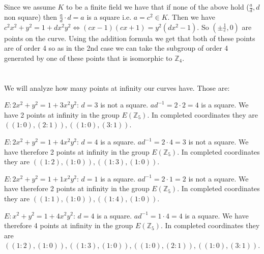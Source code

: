 \documentclass[12pt, a4paper]{article}
\begin{document}
Since we assume $K$ to be a finite field we have that if none of the above hold ($\frac{a}{d}, d$ non square) then $\frac{a}{d}\cdot d = a$ is a square i.e. $a = c^2 \in K$. Then we have $c^2x^2+y^2=1+dx^2y^2 \iff (cx-1)(cx+1)=y^2(dx^2-1)$. So $(\pm \frac{1}{c}, 0)$ are points on the curve. Using the addition formula we get that both of these points are of order 4 so as in the 2nd case we can take the subgroup of order 4 generated by one of these points that is isomorphic to $\mathbb{Z}_4$.

\section{}
We will analyze how many points at infinity our curves have. Those are:

$E: 2x^2+y^2=1+3x^2y^2$: $d=3$ is not a square. $ad^{-1} = 2 \cdot 2 = 4$ is a square. We have 2 points at infinity in the group $E(\mathbb{Z}_5)$. In completed coordinates they are $((1:0), (2:1)), ((1:0),(3:1))$.

$E: 2x^2+y^2=1+4x^2y^2$: $d=4$ is a square. $ad^{-1} = 2\cdot 4 = 3$ is not a square. We have therefore 2 points at infinity in the group $E(\mathbb{Z}_5)$. In completed coordinates they are $((1:2), (1:0)), ((1:3),(1:0))$.

$E: 2x^2+y^2=1+1x^2y^2$: $d=1$ is a square. $ad^{-1} = 2\cdot 1 = 2$ is not a square. We have therefore 2 points at infinity in the group $E(\mathbb{Z}_5)$. In completed coordinates they are $((1:1), (1:0)), ((1:4),(1:0))$.

$E:x^2+y^2=1+4x^2y^2$: $d=4$ is a square. $ad^{-1} = 1\cdot 4 = 4$ is a square. We have therefore 4 points at infinity in the group $E(\mathbb{Z}_5)$. In completed coordinates they are $((1:2), (1:0)), ((1:3),(1:0)), ((1:0), (2:1)), ((1:0), (3:1))$.
\end{document}
